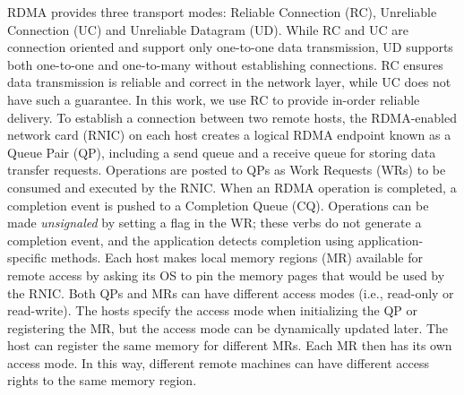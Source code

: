 RDMA provides three transport modes: Reliable Connection (RC), Unreliable Connection (UC) and Unreliable Datagram (UD). 
While RC and UC are connection oriented and support only one-to-one data transmission, UD supports both one-to-one and one-to-many without establishing connections.
RC ensures data transmission is reliable and correct in the network layer, while UC does not have such a guarantee.
In this work, we use RC to provide in-order reliable delivery.
To establish a connection between two remote hosts, the RDMA-enabled network card (RNIC) on each host creates a logical RDMA endpoint known as a Queue Pair (QP), including a send queue and a receive queue for storing data transfer requests. 
Operations are posted to QPs as Work Requests (WRs) to be consumed and executed by the RNIC. 
When an RDMA operation is completed, a completion event is pushed to a Completion Queue (CQ).
Operations can be made \emph{unsignaled} by setting a flag in the WR; these verbs do not generate a completion event, and the application detects completion using application-specific methods.
Each host makes local memory regions (MR) available for remote access by asking its OS to pin the memory pages that would be used by the RNIC.
Both QPs and MRs can have different access modes (i.e., read-only or read-write). 
The hosts specify the access mode when initializing the QP or registering the MR, but the access mode can be dynamically updated later. 
The host can register the same memory for different MRs. Each MR then has its own access mode.
In this way, different remote machines can have different access rights to the same memory region. 
